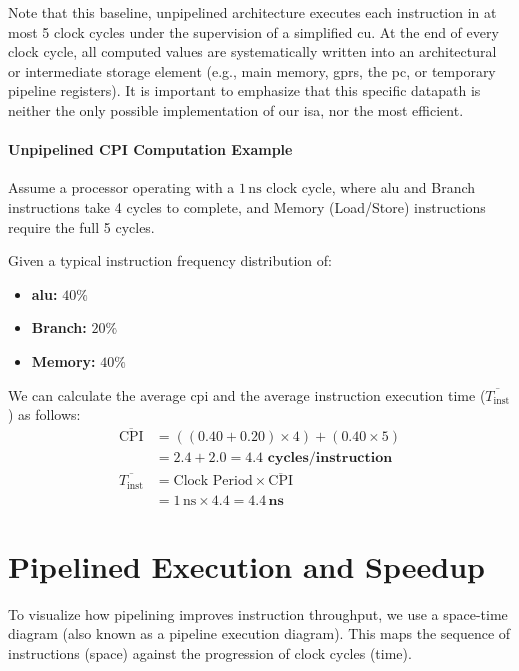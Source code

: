 \noindent Note that this baseline, unpipelined architecture executes each instruction in at most 5 clock cycles under the supervision of a simplified \gls{cu}. At the end of every clock cycle, all computed values are systematically written into an architectural or intermediate storage element (e.g., main memory, \glspl{gpr}, the \gls{pc}, or temporary pipeline registers). It is important to emphasize that this specific datapath is neither the only possible implementation of our \gls{isa}, nor the most efficient.

\paragraph{Unpipelined CPI Computation Example} 
Assume a processor operating with a \(1\,\text{ns}\) clock cycle, where \gls{alu} and Branch instructions take 4 cycles to complete, and Memory (Load/Store) instructions require the full 5 cycles. 

Given a typical instruction frequency distribution of:
\begin{itemize}
    \item \textbf{\gls{alu}:} $40\%$
    \item \textbf{Branch:} $20\%$
    \item \textbf{Memory:} $40\%$
\end{itemize}

\noindent We can calculate the average \gls{cpi} and the average instruction execution time (\(\overline{T_{\text{inst}}}\)) as follows:
\begin{align*}
    \overline{\text{CPI}} &= \left( (0.40 + 0.20) \times 4 \right) + (0.40 \times 5) \\
                          &= 2.4 + 2.0 = \mathbf{4.4 \text{ cycles/instruction}} \\[1em]
    \overline{T_{\text{inst}}} &= \text{Clock Period} \times \overline{\text{CPI}} \\
                               &= 1\,\text{ns} \times 4.4 = \mathbf{4.4\,\text{ns}}
\end{align*}

\section{Pipelined Execution and Speedup}
To visualize how pipelining improves instruction throughput, we use a space-time diagram (also known as a pipeline execution diagram). This maps the sequence of instructions (space) against the progression of clock cycles (time). 

